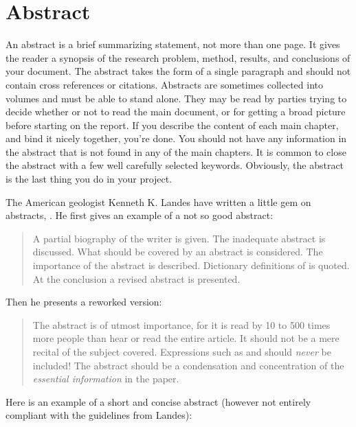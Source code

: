 
\chapter*{Abstract}
\label{chap:abstract}

An abstract is a brief summarizing statement, not more than one page. It gives the reader a synopsis of the research problem, method, results, and conclusions of your document. The abstract takes the form of a single paragraph and should not contain cross references or citations. Abstracts are sometimes collected into volumes and must be able to stand alone. They may be read by parties trying to decide whether or not to read the main document, or for getting a broad picture before starting on the report. If you describe the content of each main chapter, and bind it nicely together, you’re done. You should not have any information in the abstract that is not found in any of the main chapters. It is common to close the abstract with a few well carefully selected keywords. Obviously, the abstract is the last thing you do in your project. 

The American geologist  Kenneth K. Landes have written a little gem on abstracts, \parencite{landes1966scrutiny}. He first gives an example of a not so good abstract:

\begin{quotation}
A partial biography of the writer is given. The inadequate abstract is discussed. What should be covered by an abstract is considered. The importance of the abstract is described. Dictionary definitions of  is quoted. At the conclusion a revised abstract is presented.
\end{quotation}

Then he presents a reworked version:

\begin{quotation}
The abstract is of utmost importance, for it is read by 10 to 500 times more people than hear or read the entire article. It should not be a mere recital of the subject covered. Expressions such as  and  should \emph{never} be included! The abstract should be a condensation and concentration of the \emph{essential information} in the paper.
\end{quotation}

Here is an example of a short and concise abstract (however not entirely compliant with the guidelines from Landes)\parencite{winger12e3s}:


